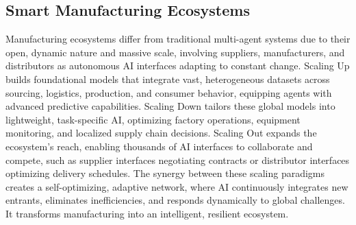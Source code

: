 \subsection{Smart Manufacturing Ecosystems}

Manufacturing ecosystems differ from traditional multi-agent systems due to their open, dynamic nature and massive scale, involving suppliers, manufacturers, and distributors as autonomous AI interfaces adapting to constant change. Scaling Up builds foundational models that integrate vast, heterogeneous datasets across sourcing, logistics, production, and consumer behavior, equipping agents with advanced predictive capabilities. Scaling Down tailors these global models into lightweight, task-specific AI, optimizing factory operations, equipment monitoring, and localized supply chain decisions. Scaling Out expands the ecosystem’s reach, enabling thousands of AI interfaces to collaborate and compete, such as supplier interfaces negotiating contracts or distributor interfaces optimizing delivery schedules. The synergy between these scaling paradigms creates a self-optimizing, adaptive network, where AI continuously integrates new entrants, eliminates inefficiencies, and responds dynamically to global challenges. It transforms manufacturing into an intelligent, resilient ecosystem.